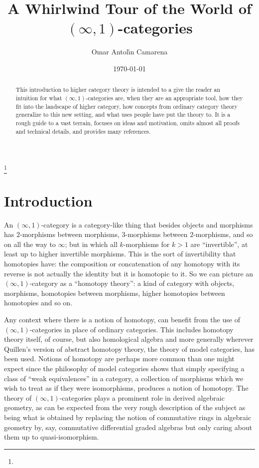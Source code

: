 \documentclass{conm-p-l}
\theoremstyle{definition} \newtheorem{definition}[theorem]{Definition}
\theoremstyle{remark} \newtheorem{remark}[theorem]{Remark}
\numberwithin{equation}{section}
\newcommand{\oo}{\infty}
\newcommand{\io}{$(\oo,1)$}
\begin{document}
\title[Whirlwind Tour of $(\infty,1)$-categories]{A Whirlwind Tour of
the World of $(\infty,1)$-categories}

\author{Omar Antol\'{\i}n Camarena} \address{} \curraddr{}
 \thanks{}


\date{\today}

\begin{abstract}
  This introduction to higher category theory is intended to a give
  the reader an intuition for what \io-categories are, when they are
  an appropriate tool, how they fit into the landscape of higher
  category, how concepts from ordinary category theory generalize to
  this new setting, and what uses people have put the theory to. It is
  a rough guide to a vast terrain, focuses on ideas and motivation,
  omits almost all proofs and technical details, and provides many
  references.
\end{abstract}

\maketitle

\section{Introduction}

An \io-category is a category-like thing that besides objects and
morphisms has $2$-morphisms between morphisms, $3$-morphisms between
$2$-morphisms, and so on all the way to $\oo$; but in which all
$k$-morphisms for $k>1$ are ``invertible'', at least up to higher
invertible morphisms. This is the sort of invertibility that
homotopies have: the composition or concatenation of any homotopy with
its reverse is not actually the identity but it is homotopic to it. So
we can picture an \io-category as a ``homotopy theory'': a kind of
category with objects, morphisms, homotopies between morphisms, higher
homotopies between homotopies and so on.

Any context where there is a notion of homotopy, can benefit from the
use of \io-categories in place of ordinary categories. This includes
homotopy theory itself, of course, but also homological algebra and
more generally wherever Quillen's version of abstract homotopy theory,
the theory of model categories, has been used. Notions of homotopy are
perhaps more common than one might expect since the philosophy of
model categories shows that simply specifying a class of ``weak
equivalences'' in a category, a collection of morphisms which we wish
to treat as if they were isomorphisms, produces a notion of homotopy.
The theory of \io-categories plays a prominent role in derived
algebraic geometry, as can be expected from the very rough description
of the subject as being what is obtained by replacing the notion of
commutative rings in algebraic geometry by, say, commutative
differential graded algebras but only caring about them up to
quasi-isomorphism.
\end{document}
